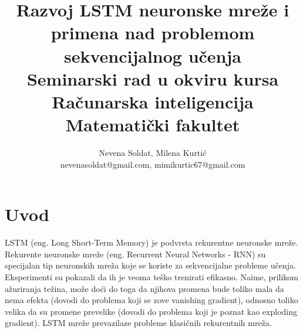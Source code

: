 \documentclass[a4paper]{article}
\begin{document}
\title{Razvoj LSTM neuronske mreže i primena nad problemom sekvencijalnog učenja\\ \small{Seminarski rad u okviru kursa\\Računarska inteligencija\\ Matematički fakultet}}

\author{Nevena Soldat, Milena Kurtić\\ nevenasoldat@gmail.com, mimikurtic67@gmail.com}


\maketitle


\tableofcontents

\newpage

\section{Uvod}
\label{sec:uvod}
LSTM (eng. Long Short-Term Memory) je podvrsta rekurentne neuronske mreže. Rekurente neuronske mreže (eng. Recurrent Neural Networks - RNN) su specijalan tip neuronskih mreža koje se koriste za sekvencijalne probleme učenja. Eksperimenti su pokazali da ih je veoma teško trenirati efikasno. Naime, prilikom ažuriranja težina, može doći do toga da njihova promena bude toliko mala da nema efekta (dovodi do problema koji se zove vanishing gradient), odnosno toliko velika da su promene prevelike (dovodi do problema koji je poznat kao exploding gradient). LSTM mreže prevazilaze probleme klasičnih rekurentnih mreža. 
\end{document}
